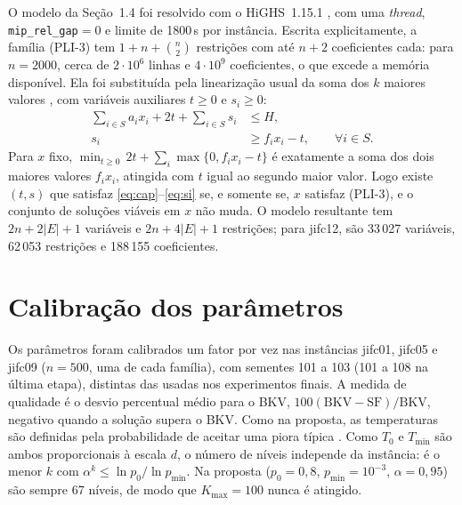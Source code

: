 \documentclass[11pt,a4paper]{article}
\begin{document}
O modelo da Seção~1.4 foi resolvido com o HiGHS~1.15.1
\citep{HuangfuHall2018}, com uma \emph{thread}, \texttt{mip\_rel\_gap}$=0$ e
limite de 1800\,s por instância. Escrita explicitamente, a família (PLI-3)
tem $1+n+\binom{n}{2}$ restrições com até $n+2$ coeficientes cada: para
$n=2000$, cerca de $2\cdot10^6$ linhas e $4\cdot10^9$ coeficientes, o que
excede a memória disponível. Ela foi substituída pela linearização usual da
soma dos $k$ maiores valores \citep{OgryczakTamir2003}, com variáveis
auxiliares $t\geq0$ e $s_i\geq0$:
\begin{align}
  \sum_{i\in S} a_i x_i + 2t + \sum_{i\in S} s_i &\leq H, \label{eq:cap}\\
  s_i &\geq f_i x_i - t, \qquad \forall i\in S. \label{eq:si}
\end{align}
Para $x$ fixo, $\min_{t\geq0}\, 2t+\sum_i \max\{0, f_i x_i - t\}$ é
exatamente a soma dos dois maiores valores $f_i x_i$, atingida com $t$ igual
ao segundo maior valor. Logo existe $(t,s)$ que satisfaz
\eqref{eq:cap}--\eqref{eq:si} se, e somente se, $x$ satisfaz (PLI-3), e o
conjunto de soluções viáveis em $x$ não muda. O modelo resultante tem
$2n+2|E|+1$ variáveis e $2n+4|E|+1$ restrições; para jifc12, são 33\,027
variáveis, 62\,053 restrições e 188\,155 coeficientes.

\section{Calibração dos parâmetros}\label{sec:calib}

Os parâmetros foram calibrados um fator por vez nas instâncias jifc01, jifc05
e jifc09 ($n=500$, uma de cada família), com sementes 101 a 103 (101 a 108
na última etapa), distintas das usadas nos experimentos finais. A medida de
qualidade é o desvio percentual médio para o BKV,
$100(\mathrm{BKV}-\mathrm{SF})/\mathrm{BKV}$, negativo quando a solução
supera o BKV. Como na proposta, as temperaturas são definidas pela
probabilidade de aceitar uma piora típica \citep{Johnson1989}. Como $T_0$ e
$T_{\min}$ são ambos proporcionais à escala $d$, o
número de níveis independe da instância: é o menor $k$ com
$\alpha^k\leq \ln p_0/\ln p_{\min}$. Na proposta ($p_0=0{,}8$,
$p_{\min}=10^{-3}$, $\alpha=0{,}95$) são sempre 67 níveis, de modo que
$K_{\max}=100$ nunca é atingido.

\begin{table}[htbp]
  \centering
  \caption{Desvio médio para o BKV (\%) em função de $p_0$ e $p_{\min}$, com
    $\alpha=0{,}95$, $L=50|S|$ e operadores 40/30/30. Entre parênteses, o
    número de níveis de temperatura.}
  \label{tab:temp}
  
\end{table}
\end{document}
